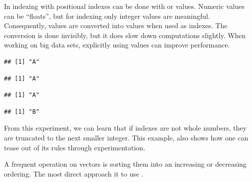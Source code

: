 \documentclass[krantz2]{krantz}\usepackage{knitr}%
\begin{document}
\begin{explainbox}\label{box:vec:sort}
In \Rlang indexing with positional indexes can be done with  or  values. Numeric values can be ``floats'', but for indexing only integer values are meaningful. Consequently,  values are converted into  values when used as indexes. The conversion is done invisibly, but it does slow down computations slightly. When working on big data sets, explicitly using  values can improve performance.

\begin{knitrout}\footnotesize
{}\color{fgcolor}\begin{kframe}
\begin{alltt}
 \hlkwb{<-} \hlstd{LETTERS[}\hlopt{:}\hlstd{]}
\hlstd{b[}\hlstd{]}
\end{alltt}
\begin{verbatim}
## [1] "A"
\end{verbatim}
\begin{alltt}
\hlstd{b[}\hlstd{]}
\end{alltt}
\begin{verbatim}
## [1] "A"
\end{verbatim}
\begin{alltt}
\hlstd{b[}\hlstd{]} 
\end{alltt}
\begin{verbatim}
## [1] "A"
\end{verbatim}
\begin{alltt}
\hlstd{b[}\hlstd{]}
\end{alltt}
\begin{verbatim}
## [1] "B"
\end{verbatim}
\end{kframe}
\end{knitrout}

From this experiment, we can learn that if indexes are not whole numbers, they are truncated to the next smaller integer. This example, also shows how one can tease out of \Rlang its rules through experimentation.

\end{explainbox}

A frequent operation on vectors is sorting them into an increasing or decreasing ordering. The most direct approach it to use .
\end{document}
